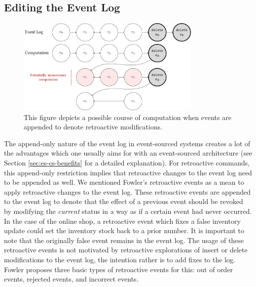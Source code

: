 \subsection{Editing the Event Log}
\label{sec:editing-log}
\begin{figure}
	\centering

	\includegraphics[width=0.8\textwidth]{../illustrations/reversal-events2.pdf}
	\caption{
		This figure depicts a possible course of computation when events 
		are appended to denote retroactive modifications.
	}
	\label{fig:reversal-events}
\end{figure}

The append-only nature of the event log in event-sourced systems creates a lot 
of the advantages which one usually aims for with an event-sourced architecture 
(see Section \ref{sec:es-cs-benefits} for a detailed explanation).
For retroactive commands, this append-only restriction implies that retroactive 
changes to the event log need to be appended as well. We mentioned Fowler's 
retroactive events \cite{Fowler2005_2} as a mean to apply retroactive changes 
to the event log.
These retroactive events are appended to the event log to denote that the 
effect of a previous event should be revoked by modifying the \emph{current} 
status in a way as if a certain event had never occurred. In the case of the
online shop, a retroactive event which fixes a false inventory update could set 
the inventory stock back to a prior number.
It is important to note that the originally false event remains in the event log.
The usage of these retroactive events is not motivated by retroactive explorations 
of insert or delete modifications to the event log, the intention rather is to 
add fixes to the log. 
Fowler proposes three basic types of retroactive events for this: out of order 
events, rejected events, and incorrect events. 

